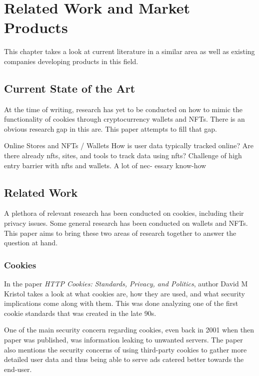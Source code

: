 \chapter{Related Work and Market Products}
\label{ch:SOTA}
This chapter takes a look at current literature in a similar area as well as existing companies developing products in this field.

%
%
\section{Current State of the Art}
\label{sec:sota:stateOfTheArt}
At the time of writing, research has yet to be conducted on how to mimic the functionality of cookies through cryptocurrency wallets and NFTs. There is an obvious research gap in this are. This paper attempts to fill that gap. 

Online Stores and NFTs / Wallets
How is user data typically tracked online? 
Are there already nfts, sites, and tools to track data using nfts? 
Challenge of high entry barrier with nfts and wallets. A lot of nec- essary know-how 


%
%
\section{Related Work}
\label{sec:sota:relatedWork}
A plethora of relevant research has been conducted on cookies, including their privacy issues. Some general research has been conducted on wallets and NFTs. This paper aims to bring these two areas of research together to answer the question at hand.

\subsection{Cookies}
\label{sec:sota:cookies}
In the paper \textit{HTTP Cookies: Standards, Privacy, and Politics}, author David M Kristol takes a look at what cookies are, how they are used, and what security implications come along with them. This was done analyzing one of the first cookie standards that was created in the late 90s. \cite{cookies1}

One of the main security concern regarding cookies, even back in 2001 when then paper was published, was information leaking to unwanted servers. The paper also mentions the security concerns of using third-party cookies to gather more detailed user data and thus being able to serve ads catered better towards the end-user. \cite{cookies1}

